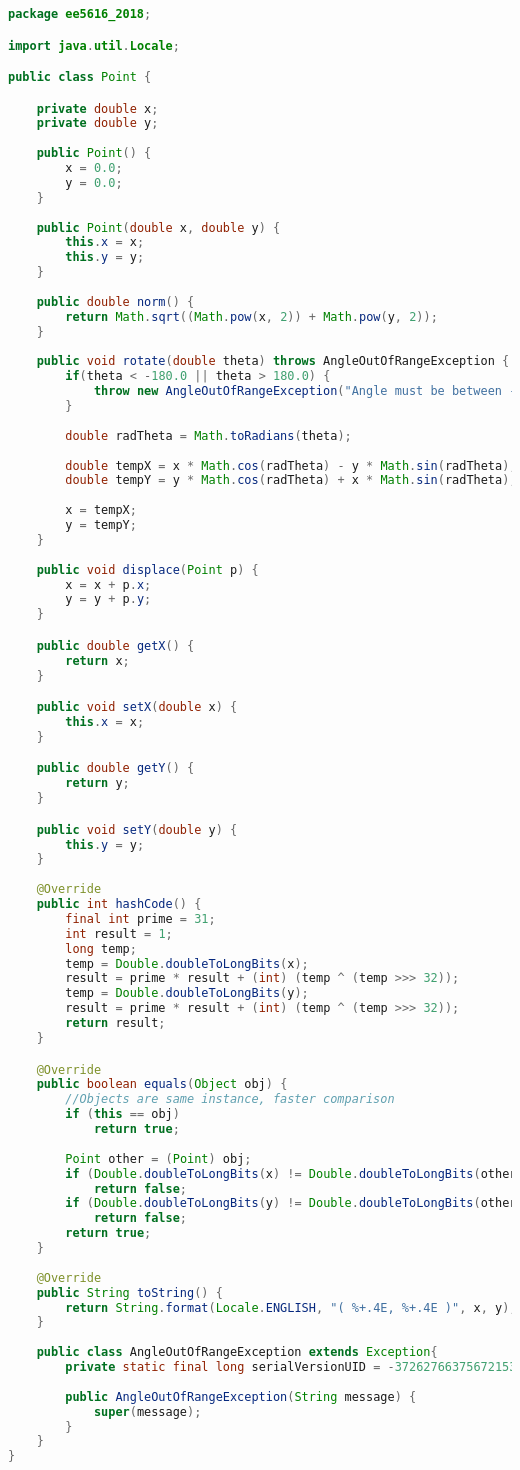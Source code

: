 \begin{lstlisting}[language=java,
    label=lst:point,
    caption=Class Point
]
package ee5616_2018;

import java.util.Locale;

public class Point {

	private double x;
	private double y;
	
	public Point() {
		x = 0.0;
		y = 0.0;
	}
	
	public Point(double x, double y) {
		this.x = x;
		this.y = y;
	}
	
	public double norm() {
		return Math.sqrt((Math.pow(x, 2)) + Math.pow(y, 2));
	}
    
    public void rotate(double theta) throws AngleOutOfRangeException {
		if(theta < -180.0 || theta > 180.0) {
			throw new AngleOutOfRangeException("Angle must be between -180 and 180 degree");
		}
		
		double radTheta = Math.toRadians(theta);
		
		double tempX = x * Math.cos(radTheta) - y * Math.sin(radTheta);
		double tempY = y * Math.cos(radTheta) + x * Math.sin(radTheta);
		
		x = tempX;
		y = tempY;
	}
	
	public void displace(Point p) {
		x = x + p.x;
		y = y + p.y;
	}

	public double getX() {
		return x;
	}

	public void setX(double x) {
		this.x = x;
	}

	public double getY() {
		return y;
	}

	public void setY(double y) {
		this.y = y;
	}
	
	@Override
	public int hashCode() {
		final int prime = 31;
		int result = 1;
		long temp;
		temp = Double.doubleToLongBits(x);
		result = prime * result + (int) (temp ^ (temp >>> 32));
		temp = Double.doubleToLongBits(y);
		result = prime * result + (int) (temp ^ (temp >>> 32));
		return result;
	}

	@Override
	public boolean equals(Object obj) {
		//Objects are same instance, faster comparison
		if (this == obj)
			return true;
		
		Point other = (Point) obj;
		if (Double.doubleToLongBits(x) != Double.doubleToLongBits(other.x))
			return false;
		if (Double.doubleToLongBits(y) != Double.doubleToLongBits(other.y))
			return false;
		return true;
	}
	
	@Override
	public String toString() {
		return String.format(Locale.ENGLISH, "( %+.4E, %+.4E )", x, y);
	}
	
	public class AngleOutOfRangeException extends Exception{
		private static final long serialVersionUID = -3726276637567215315L;
		
		public AngleOutOfRangeException(String message) {
			super(message);
		}
	}
}
\end{lstlisting}